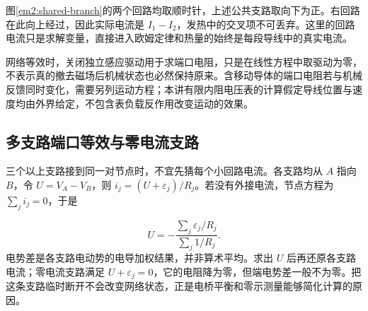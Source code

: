 图\ref{em2:shared-branch}的两个回路均取顺时针，上述公共支路取向下为正。右回路在此向上经过，因此实际电流是 $I_1-I_2$，发热中的交叉项不可丢弃。这里的回路电流只是求解变量，直接进入欧姆定律和热量的始终是每段导线中的真实电流。



网络等效时，关闭独立感应驱动用于求端口电阻，只是在线性方程中取驱动为零，不表示真的撤去磁场后机械状态也必然保持原来。含移动导体的端口电阻若与机械反馈同时变化，需要另列运动方程；本讲有限内阻电压表的计算假定导线位置与速度均由外界给定，不包含表负载反作用改变运动的效果。



\subsection{多支路端口等效与零电流支路}

三个以上支路接到同一对节点时，不宜先猜每个小回路电流。各支路均从 $A$ 指向 $B$，令 $U=V_A-V_B$，则 $i_j=(U+\varepsilon_j)/R_j$。若没有外接电流，节点方程为 $\sum_j i_j=0$，于是

\[U=-\frac{\sum_j\varepsilon_j/R_j}{\sum_j1/R_j}.\]
电势差是各支路电动势的电导加权结果，并非算术平均。求出 $U$ 后再还原各支路电流；零电流支路满足 $U+\varepsilon_j=0$，它的电阻降为零，但端电势差一般不为零。把这条支路临时断开不会改变网络状态，正是电桥平衡和零示测量能够简化计算的原因。


